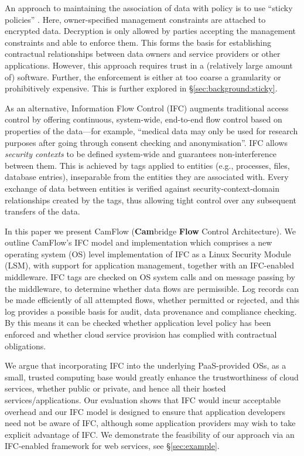 \documentclass[10pt,journal,compsoc]{IEEEtran}
\begin{document}
An approach to maintaining the association of data with policy is to use ``sticky policies'' \cite{stickyPol:2011}.
Here, owner-specified management constraints are attached to encrypted data.
Decryption is only allowed by parties accepting the management constraints and able to enforce them.
This forms the basis for establishing contractual relationships between data owners and service providers or other applications.
However, this approach requires trust in a (relatively large amount of) software. 
Further, the enforcement is either at too coarse a granularity or prohibitively expensive.
This is further explored in \S\ref{sec:background:sticky}.


As an alternative, Information Flow Control (IFC) augments traditional access control by offering continuous, system-wide, end-to-end flow control based on properties of the data---for example, ``medical data may only be used for research purposes after going through consent checking and anonymisation''.
IFC allows \emph{security contexts} to be defined system-wide and guarantees non-interference between them. This is achieved by tags applied to entities (e.g., processes, files, database entries), inseparable from the entities they are associated with.
Every exchange of data between entities is verified against security-context-domain relationships created by the tags, thus allowing tight control over any subsequent transfers of the data.

In this paper we present CamFlow (\textbf{Cam}bridge \textbf{Flow} Control Architecture). 
We outline CamFlow's IFC model and implementation which comprises a new operating system (OS) level implementation of IFC as a Linux Security Module (LSM), with support for application management, together with an IFC-enabled middleware.
IFC tags are checked on OS system calls and on message passing by the middleware, to determine whether data flows are permissible. Log records can be made efficiently of all attempted flows, whether permitted or rejected, and this log provides a possible basis for audit, data provenance and compliance checking. By this means it can be checked whether application level policy has been enforced and whether cloud service provision has complied with contractual obligations. 

We argue that incorporating IFC into the underlying PaaS-provided OSs, as a small, trusted computing base
would greatly enhance the trustworthiness of cloud services, whether public or private, and hence all their hosted services/applications. 
Our evaluation shows that IFC would incur acceptable overhead and our IFC model is designed to ensure that application developers need not be aware of IFC, although some application providers may wish to take explicit advantage of IFC. We demonstrate the feasibility of our approach via an IFC-enabled framework for web services, see \S\ref{sec:example}.
\end{document}
